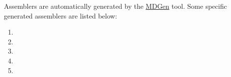 Assemblers are automatically generated by the 
\href{mlrisc-md.html}{MDGen} tool.  Some specific generated
assemblers are listed below:
\begin{enumerate}
 \item {}
 \item {}
 \item {}
 \item {}
 \item {}
\end{enumerate}
